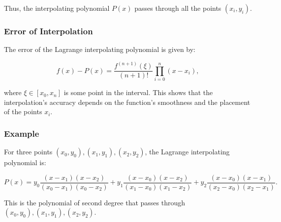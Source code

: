 Thus, the interpolating polynomial \( P(x) \) passes through all the points \( (x_i, y_i) \).

\subsubsection*{Error of Interpolation}
The error of the Lagrange interpolating polynomial is given by:

\[
f(x) - P(x) = \frac{f^{(n+1)}(\xi)}{(n+1)!} \prod_{i=0}^{n}(x - x_i),
\]

where \( \xi \in [x_0, x_n] \) is some point in the interval. This shows that the interpolation's accuracy depends on the function's smoothness and the placement of the points \( x_i \).


\subsubsection*{Example}
For three points \( (x_0, y_0), (x_1, y_1), (x_2, y_2) \), the Lagrange interpolating polynomial is:

\[
P(x) = y_0 \frac{(x - x_1)(x - x_2)}{(x_0 - x_1)(x_0 - x_2)} + y_1 \frac{(x - x_0)(x - x_2)}{(x_1 - x_0)(x_1 - x_2)} + y_2 \frac{(x - x_0)(x - x_1)}{(x_2 - x_0)(x_2 - x_1)}.
\]

This is the polynomial of second degree that passes through \( (x_0, y_0), (x_1, y_1), (x_2, y_2) \).




 








